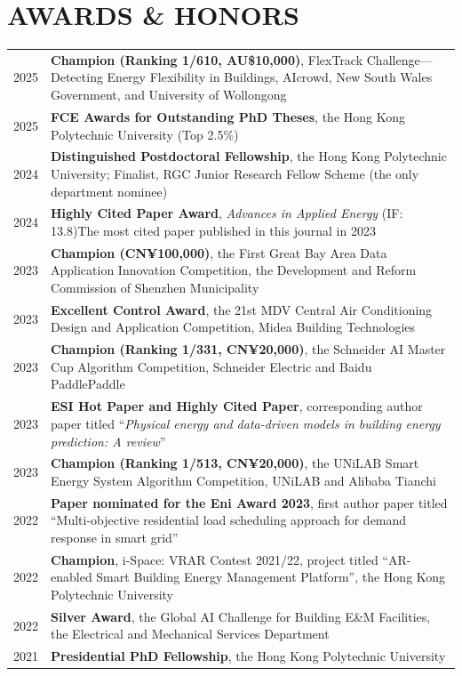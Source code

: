 \documentclass[11pt,a4paper]{article}
\newcounter{cvbookmark}
\newcommand{\cvoutline}[2]{%
  \stepcounter{cvbookmark}%
  \pdfbookmark[#1]{#2}{cvbookmark.\thecvbookmark}%
}
\newcommand{\cvsection}[2]{%
  \cvoutline{1}{#1}%
  \section*{#2}%
}
\begin{document}
\cvsection{AWARDS \& HONORS}{AWARDS \& HONORS}
\begin{longtable}{@{}p{0.75cm}@{\hspace{0.20cm}}>{\justifying\arraybackslash}p{\dimexpr\textwidth-0.95cm\relax}@{}}
2025 & \textbf{Champion (Ranking 1/610, AU\$10,000)}, FlexTrack Challenge---Detecting Energy Flexibility in Buildings, AIcrowd, New South Wales Government, and University of Wollongong \\
2025 & \textbf{FCE Awards for Outstanding PhD Theses}, the Hong Kong Polytechnic University (Top 2.5\%) \\
2024 & \textbf{Distinguished Postdoctoral Fellowship}, the Hong Kong Polytechnic University; Finalist, RGC Junior Research Fellow Scheme (the only department nominee) \\
2024 & \textbf{Highly Cited Paper Award}, \textit{Advances in Applied Energy} (IF: 13.8)\newline The most cited paper published in this journal in 2023 \\
2023 & \textbf{Champion (CN¥100,000)}, the First Great Bay Area Data Application Innovation Competition, the Development and Reform Commission of Shenzhen Municipality \\
2023 & \textbf{Excellent Control Award}, the 21st MDV Central Air Conditioning Design and Application Competition, Midea Building Technologies \\
2023 & \textbf{Champion (Ranking 1/331, CN¥20,000)}, the Schneider AI Master Cup Algorithm Competition, Schneider Electric and Baidu PaddlePaddle \\
2023 & \textbf{ESI Hot Paper and Highly Cited Paper}, corresponding author paper titled ``\textit{Physical energy and data-driven models in building energy prediction: A review}'' \\
2023 & \textbf{Champion (Ranking 1/513, CN¥20,000)}, the UNiLAB Smart Energy System Algorithm Competition, UNiLAB and Alibaba Tianchi \\
2022 & \textbf{Paper nominated for the Eni Award 2023}, first author paper titled ``Multi-objective residential load scheduling approach for demand response in smart grid'' \\
2022 & \textbf{Champion}, i-Space: VRAR Contest 2021/22, project titled ``AR-enabled Smart Building Energy Management Platform'', the Hong Kong Polytechnic University \\
2022 & \textbf{Silver Award}, the Global AI Challenge for Building E\&M Facilities, the Electrical and Mechanical Services Department \\
2021 & \textbf{Presidential PhD Fellowship}, the Hong Kong Polytechnic University \\
\end{longtable}
\end{document}

